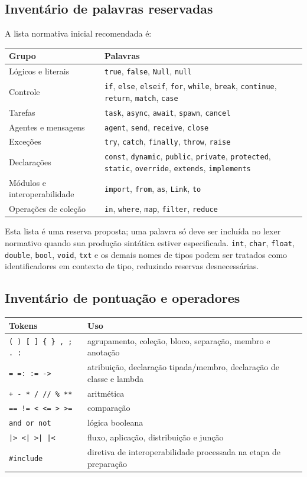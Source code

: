 \documentclass[12pt,a4paper]{article}
\begin{document}
\subsection{Inventário de palavras reservadas}
A lista normativa inicial recomendada é:
\begin{longtable}{p{3.0cm}p{10.2cm}}
\toprule
Grupo & Palavras\\
\midrule
Lógicos e literais & \texttt{true}, \texttt{false}, \texttt{Null}, \texttt{null}\\
Controle & \texttt{if}, \texttt{else}, \texttt{elseif}, \texttt{for}, \texttt{while}, \texttt{break}, \texttt{continue}, \texttt{return}, \texttt{match}, \texttt{case}\\
Tarefas & \texttt{task}, \texttt{async}, \texttt{await}, \texttt{spawn}, \texttt{cancel}\\
Agentes e mensagens & \texttt{agent}, \texttt{send}, \texttt{receive}, \texttt{close}\\
Exceções & \texttt{try}, \texttt{catch}, \texttt{finally}, \texttt{throw}, \texttt{raise}\\
Declarações & \texttt{const}, \texttt{dynamic}, \texttt{public}, \texttt{private}, \texttt{protected}, \texttt{static}, \texttt{override}, \texttt{extends}, \texttt{implements}\\
Módulos e interoperabilidade & \texttt{import}, \texttt{from}, \texttt{as}, \texttt{Link}, \texttt{to}\\
Operações de coleção & \texttt{in}, \texttt{where}, \texttt{map}, \texttt{filter}, \texttt{reduce}\\
\bottomrule
\end{longtable}
Esta lista é uma reserva proposta; uma palavra só deve ser incluída no lexer normativo quando sua produção sintática estiver especificada. \texttt{int}, \texttt{char}, \texttt{float}, \texttt{double}, \texttt{bool}, \texttt{void}, \texttt{txt} e os demais nomes de tipos podem ser tratados como identificadores em contexto de tipo, reduzindo reservas desnecessárias.
\subsection{Inventário de pontuação e operadores}
\begin{longtable}{p{3.4cm}p{9.8cm}}
\toprule
Tokens & Uso\\
\midrule
\texttt{( ) [ ] \{ \} , ; . :} & agrupamento, coleção, bloco, separação, membro e anotação\\
\texttt{= =: := ->} & atribuição, declaração tipada/membro, declaração de classe e lambda\\
\texttt{+ - * / // \% **} & aritmética\\
\texttt{== != < <= > >=} & comparação\\
\texttt{and or not} & lógica booleana\\
\texttt{|> <| >| |<} & fluxo, aplicação, distribuição e junção\\
\texttt{\#include} & diretiva de interoperabilidade processada na etapa de preparação\\
\bottomrule
\end{longtable}
\end{document}
